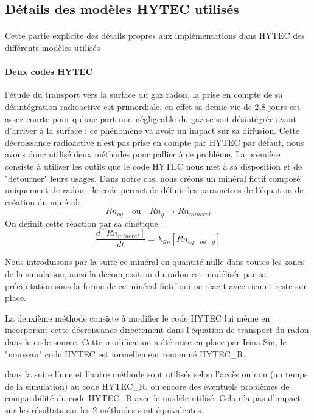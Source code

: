 \documentclass{article}
\begin{document}
\subsection{Détails des modèles HYTEC utilisés}
\label{annexe:detail_modele_radon_sub_sec}
\paragraph{}Cette partie explicite des détails propres aux implémentations dans HYTEC des différents modèles utilisés

\paragraph{Deux codes HYTEC}
l'étude du transport vers la surface du gaz radon, la prise en compte de sa désintégration radioactive est primordiale, en effet sa demie-vie de 2,8 jours est assez courte pour qu'une part non négligeable du gaz se soit désintégrée  avant d'arriver à la surface : ce phénomène va avoir un impact sur sa diffusion. Cette décroissance radioactive n'est pas prise en compte par HYTEC par défaut, nous avons donc utilisé deux méthodes pour pallier à ce problème.
La première consiste à utiliser les outils que le code HYTEC nous met à sa disposition et de "détourner" leurs usages. Dans notre cas, nous créons un minéral fictif composé uniquement de radon ; le code permet de définir les paramètres de l'équation de création du minéral: 
$$Rn_{aq} \quad \text{ou} \quad Rn_{g} \rightarrow Rn_{mineral}$$
On définit cette réaction par sa cinétique : 
$$ \frac{d\left[ Rn_{mineral} \right]}{dt}=\lambda_{Rn} \left[ Rn_{aq \quad ou \quad g} \right] $$

Nous introduisons par la suite ce minéral en quantité nulle dans toutes les zones de la simulation, ainsi la décomposition du radon est modélisée par sa précipitation sous la forme de ce minéral fictif qui ne réagit avec rien et reste sur place.

La deuxième méthode consiste à modifier le code HYTEC lui même en incorporant cette décroissance directement dans l'équation de transport du radon dans le code source. Cette modification a été mise en place par Irina Sin, le "nouveau" code HYTEC est formellement renommé HYTEC\_R.

dans la suite l'une et l'autre méthode sont utilisés selon l'accès ou non (au temps de la simulation) au code HYTEC\_R, ou encore des éventuels problèmes de compatibilité du code HYTEC\_R avec le modèle utilisé. Cela n'a pas d'impact sur les résultats car les 2 méthodes sont équivalentes.
\end{document}
